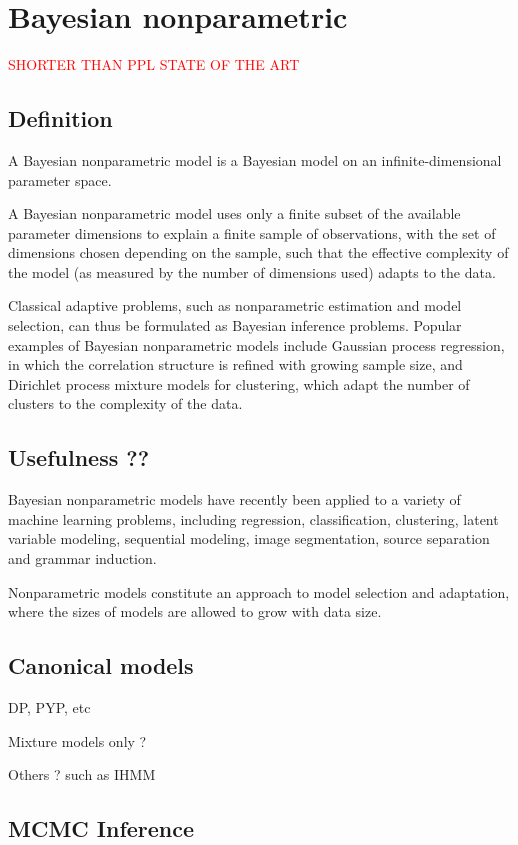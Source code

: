 \chapter{Bayesian nonparametric}
\textcolor{red}{SHORTER THAN PPL STATE OF THE ART}

\section{Definition} \label{BNP_def}
A Bayesian nonparametric model is a Bayesian model on an infinite-dimensional parameter space.

A Bayesian nonparametric model uses only a finite subset of the available parameter dimensions to explain a finite sample of observations, with the set of dimensions chosen depending on the sample, such that the effective complexity of the model (as measured by the number of dimensions used) adapts to the data.

Classical adaptive problems, such as nonparametric estimation and model selection, can thus be formulated as Bayesian inference problems. Popular examples of Bayesian nonparametric models include Gaussian process regression, in which the correlation structure is refined with growing sample size, and Dirichlet process mixture models for clustering, which adapt the number of clusters to the complexity of the data.

\section{Usefulness ??}
Bayesian nonparametric models have recently been applied to a variety of machine learning problems, including regression, classification, clustering, latent variable modeling, sequential modeling, image segmentation, source separation and grammar induction.


Nonparametric models constitute an approach to model selection and adaptation, where the sizes of models are allowed to grow with data size.

\section{Canonical models}
DP, PYP, etc

Mixture models only ?

Others ? such as IHMM

\section{MCMC Inference}

